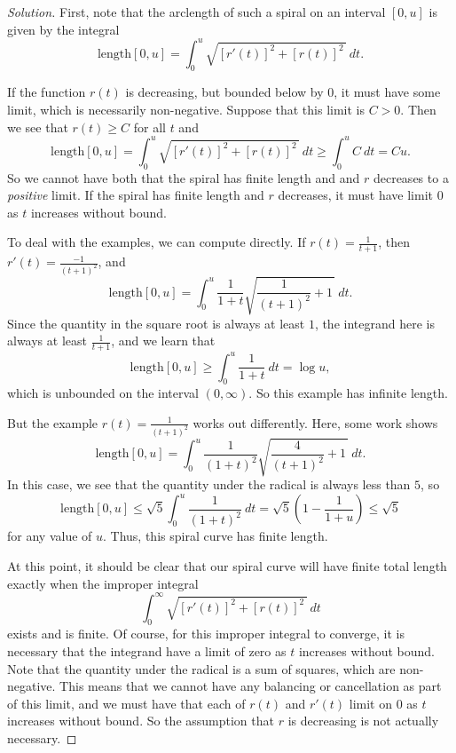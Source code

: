 \documentclass[Shifrin_Solutions_Spring_2018]{subfiles}
\begin{document}
\begin{proof}[Solution]
First, note that the arclength of such a spiral on an interval $[0,u]$ is given by the integral
\[
\text{length}[0,u] = \int_0^u \sqrt{[r'(t)]^2 + [r(t)]^2\, }\ dt. 
\]

If the function $r(t)$ is decreasing, but bounded below by $0$, it must have some limit,
which is necessarily non-negative. Suppose that this limit is $C>0$. Then we see that
$r(t) \geq C$ for all $t$ and 
\[
\text{length}[0,u] = \int_0^u \sqrt{[r'(t)]^2 + [r(t)]^2\, }\ dt \geq \int_0^u C\ dt = Cu .
\]
So we cannot have both that the spiral has finite length and and $r$ decreases to a
\emph{positive} limit. If the spiral has finite length and $r$ decreases, it must
have limit $0$ as $t$ increases without bound.

To deal with the examples, we can compute directly. If $r(t) = \frac{1}{t+1}$, then 
$r'(t) = \frac{-1}{(t+1)^2}$, and
\[
\text{length}[0,u] = \int_0^u \dfrac{1}{1+t}\sqrt{\dfrac{1}{(t+1)^2} +1\,}\ dt.
\]
Since the quantity in the square root is always at least $1$, the integrand here is always
at least $\frac{1}{t+1}$, and we learn that 
\[
\text{length}[0,u] \geq \int_0^u \dfrac{1}{1+t}\ dt = \log u, 
\]
which is unbounded on the interval $(0,\infty)$. So this example has infinite length.


But the example $r(t) = \frac{1}{(t+1)^2}$ works out differently. Here, some work shows
\[
\text{length}[0,u] = \int_0^u \dfrac{1}{(1+t)^2}\sqrt{\dfrac{4}{(t+1)^2} +1\,}\ dt.
\]
In this case, we see that the quantity under the radical is always less than $5$, so
\[
\text{length}[0,u] \leq \sqrt{5}\int_0^u \dfrac{1}{(1+t)^2}\ dt = 
\sqrt{5}\left( 1 - \dfrac{1}{1+u}\right) \leq \sqrt{5}
\]
for any value of $u$. Thus, this spiral curve has finite length.

At this point, it should be clear that our spiral curve will have finite total length
exactly when the improper integral 
\[
\int_0^\infty \sqrt{[r'(t)]^2 + [r(t)]^2\, }\ dt
\]
exists and is finite. Of course, for this improper integral to converge, it is
necessary that the integrand have a limit of zero as $t$ increases without bound.
Note that the quantity under the radical is a sum of squares, which are non-negative.
This means that we cannot have any balancing or cancellation as part of this 
limit, and we must have that each of $r(t)$ and $r'(t)$ limit on $0$ as $t$ increases 
without bound. So the assumption that $r$ is decreasing is not actually necessary.

\end{proof}
\end{document}
